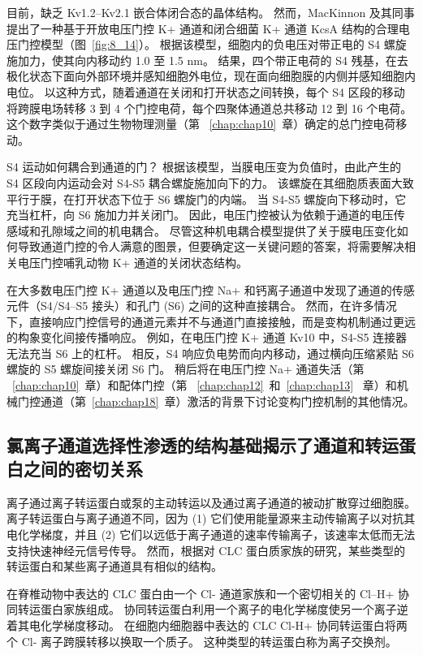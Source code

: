 目前，缺乏 Kv1.2–Kv2.1 嵌合体闭合态的晶体结构。 然而，MacKinnon 及其同事提出了一种基于开放电压门控 K+ 通道和闭合细菌 K+ 通道 KcsA 结构的合理电压门控模型（图~\ref{fig:8_14}）。
根据该模型，细胞内的负电压对带正电的 S4 螺旋施加力，使其向内移动约 1.0 至 1.5 nm。
结果，四个带正电荷的 S4 残基，在去极化状态下面向外部环境并感知细胞外电位，现在面向细胞膜的内侧并感知细胞内电位。
以这种方式，随着通道在关闭和打开状态之间转换，每个 S4 区段的移动将跨膜电场转移 3 到 4 个门控电荷，每个四聚体通道总共移动 12 到 16 个电荷。 
这个数字类似于通过生物物理测量（第 ~\ref{chap:chap10}~章）确定的总门控电荷移动。


S4 运动如何耦合到通道的门？
根据该模型，当膜电压变为负值时，由此产生的 S4 区段向内运动会对 S4-S5 耦合螺旋施加向下的力。
该螺旋在其细胞质表面大致平行于膜，在打开状态下位于 S6 螺旋门的内端。
当 S4-S5 螺旋向下移动时，它充当杠杆，向 S6 施加力并关闭门。
因此，电压门控被认为依赖于通道的电压传感域和孔隙域之间的机电耦合。
尽管这种机电耦合模型提供了关于膜电压变化如何导致通道门控的令人满意的图景，但要确定这一关键问题的答案，将需要解决相关电压门控哺乳动物 K+ 通道的关闭状态结构。


在大多数电压门控 K+ 通道以及电压门控 Na+ 和钙离子通道中发现了通道的传感元件（S4/S4–S5 接头）和孔门 (S6) 之间的这种直接耦合。
然而，在许多情况下，直接响应门控信号的通道元素并不与通道门直接接触，而是变构机制通过更远的构象变化间接传播响应。
例如，在电压门控 K+ 通道 Kv10 中，S4-S5 连接器无法充当 S6 上的杠杆。
相反，S4 响应负电势而向内移动，通过横向压缩紧贴 S6 螺旋的 S5 螺旋间接关闭 S6 门。
稍后将在电压门控 Na+ 通道失活（第 ~\ref{chap:chap10}~章）和配体门控（第 ~\ref{chap:chap12}~和~\ref{chap:chap13}~ 章）和机械门控通道（第~\ref{chap:chap18}~章）激活的背景下讨论变构门控机制的其他情况。



\subsection{氯离子通道选择性渗透的结构基础揭示了通道和转运蛋白之间的密切关系}

离子通过离子转运蛋白或泵的主动转运以及通过离子通道的被动扩散穿过细胞膜。
离子转运蛋白与离子通道不同，因为 (1) 它们使用能量源来主动传输离子以对抗其电化学梯度，并且 (2) 它们以远低于离子通道的速率传输离子，该速率太低而无法支持快速神经元信号传导。
然而，根据对 CLC 蛋白质家族的研究，某些类型的转运蛋白和某些离子通道具有相似的结构。


在脊椎动物中表达的 CLC 蛋白由一个 Cl- 通道家族和一个密切相关的 Cl--H+ 协同转运蛋白家族组成。
协同转运蛋白利用一个离子的电化学梯度使另一个离子逆着其电化学梯度移动。
在细胞内细胞器中表达的 CLC Cl-H+ 协同转运蛋白将两个 Cl- 离子跨膜转移以换取一个质子。
这种类型的转运蛋白称为离子交换剂。


